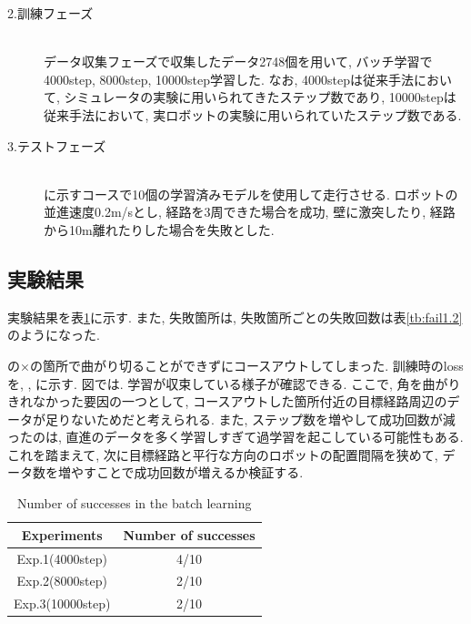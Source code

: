 \begin{description}
  \item[2.訓練フェーズ]\mbox{}\\データ収集フェーズで収集したデータ2748個を用いて, バッチ学習で4000step, 8000step, 10000step学習した. なお, 4000stepは従来手法において, シミュレータの実験に用いられてきたステップ数であり, 10000stepは従来手法において, 実ロボットの実験に用いられていたステップ数である. 
\end{description}

\begin{description}
  \item[3.テストフェーズ]\mbox{}\\ に示すコースで10個の学習済みモデルを使用して走行させる. ロボットの並進速度0.2m/sとし, 経路を3周できた場合を成功, 壁に激突したり, 経路から10m離れたりした場合を失敗とした.
\end{description}

\subsection{実験結果}
実験結果を表\ref{tb:exp1.2}に示す. また, 失敗箇所は, 失敗箇所ごとの失敗回数は表\ref{tb:fail1.2}のようになった. 
\par {}の×の箇所で曲がり切ることができずにコースアウトしてしまった. 訓練時のlossを, , に示す. 図では. 学習が収束している様子が確認できる. ここで, 角を曲がりきれなかった要因の一つとして, コースアウトした箇所付近の目標経路周辺のデータが足りないためだと考えられる. また, ステップ数を増やして成功回数が減ったのは, 直進のデータを多く学習しすぎて過学習を起こしている可能性もある. これを踏まえて, 次に目標経路と平行な方向のロボットの配置間隔を狭めて, データ数を増やすことで成功回数が増えるか検証する. 

\begin{table}[h]
  \centering
  \caption{Number of successes in the batch learning}
  \begin{tabular}{|c|c|} \hline
    Experiments & Number of successes \\ \hline
    Exp.1(4000step) & 4/10 \\ \hline
    Exp.2(8000step) & 2/10 \\ \hline
    Exp.3(10000step) & 2/10 \\ \hline
  \end{tabular}
  \label{tb:exp1.2}
\end{table}


